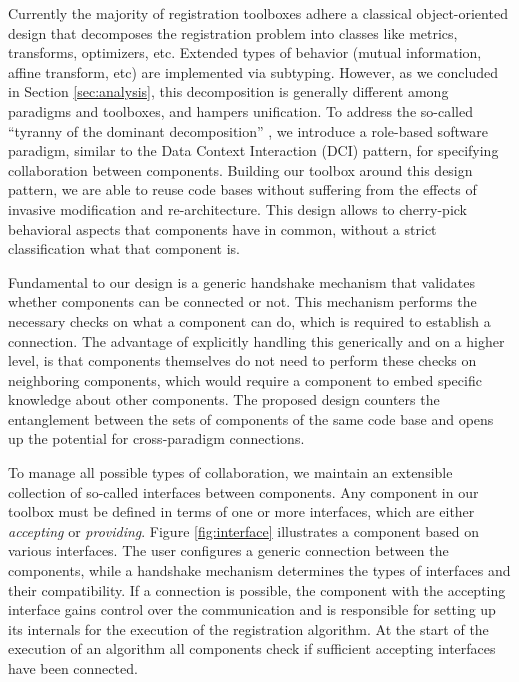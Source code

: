 Currently the majority of registration toolboxes adhere a classical
object-oriented design that decomposes the registration problem into
classes like metrics, transforms, optimizers, etc. Extended types of
behavior (mutual information, affine transform, etc) are implemented
via subtyping. However, as we concluded in Section
\ref{sec:analysis}, this decomposition is generally different among
paradigms and toolboxes, and hampers unification. To address the
so-called ``tyranny of the dominant decomposition''
\cite{Tarr:separation}, we introduce a role-based software paradigm,
similar to the Data Context Interaction (DCI) pattern, for
specifying collaboration between components. Building our toolbox
around this design pattern, we are able to reuse code bases without
suffering from the effects of invasive modification and
re-architecture. 
This design allows to cherry-pick behavioral aspects that components
have in common, without a strict classification what that component
is. 

Fundamental to our design is a generic handshake mechanism that
validates whether components can be connected or not. This mechanism
performs the necessary checks on what a component can do, which is
required to establish a connection. The advantage of explicitly
handling this generically and on a higher level, is that components
themselves do not need to perform these checks on neighboring
components, which would require a component to embed specific
knowledge about other components. The proposed design counters the
entanglement between the sets of components of the same code base
and opens up the potential for cross-paradigm connections.

To manage all possible types of collaboration, we maintain an
extensible collection of so-called interfaces between components.
Any component in our toolbox must be defined in terms of one or more
interfaces, which are either \emph{accepting} or \emph{providing}.
Figure \ref{fig:interface} illustrates a component based on various
interfaces. 
The user configures a generic connection between the components, while a handshake mechanism determines the types of interfaces and their compatibility.
If a connection is
possible, the component with the accepting interface gains control
over the communication and is responsible for setting up its
internals for the execution of the registration algorithm.
At the start of the execution of an algorithm all components check if sufficient accepting interfaces have been connected.

